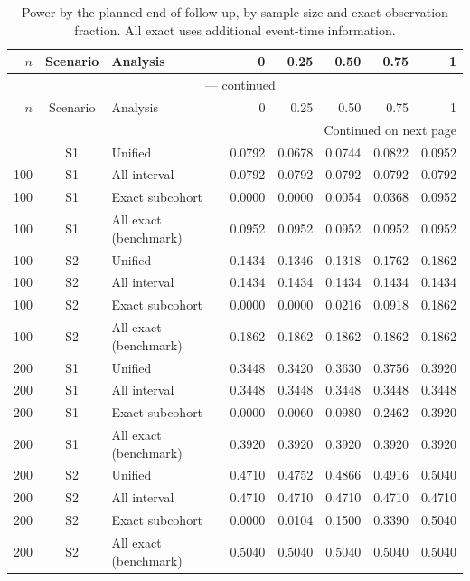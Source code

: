 \documentclass[12pt]{article}
\theoremstyle{definition}
\theoremstyle{remark}
\begin{document}
\begingroup
\scriptsize
\setlength{\tabcolsep}{3pt}
\renewcommand{\arraystretch}{1.10}
\setlength{\LTcapwidth}{\textwidth}
\begin{longtable}{rclrrrrr}
\caption{Power by the planned end of follow-up, by sample size and exact-observation fraction. All exact uses additional event-time information.}\label{tab:app-mixed-power}\\
\toprule
$n$ & Scenario & Analysis & 0 & 0.25 & 0.50 & 0.75 & 1 \\
\midrule
\endfirsthead
\multicolumn{8}{c}{\tablename\ \thetable{} --- continued}\\
\toprule
$n$ & Scenario & Analysis & 0 & 0.25 & 0.50 & 0.75 & 1 \\
\midrule
\endhead
\midrule
\multicolumn{8}{r}{Continued on next page}\\
\endfoot
\bottomrule
\endlastfoot
100 & S1 & Unified & 0.0792 & 0.0678 & 0.0744 & 0.0822 & 0.0952 \\
100 & S1 & All interval & 0.0792 & 0.0792 & 0.0792 & 0.0792 & 0.0792 \\
100 & S1 & Exact subcohort & 0.0000 & 0.0000 & 0.0054 & 0.0368 & 0.0952 \\
100 & S1 & All exact (benchmark) & 0.0952 & 0.0952 & 0.0952 & 0.0952 & 0.0952 \\
100 & S2 & Unified & 0.1434 & 0.1346 & 0.1318 & 0.1762 & 0.1862 \\
100 & S2 & All interval & 0.1434 & 0.1434 & 0.1434 & 0.1434 & 0.1434 \\
100 & S2 & Exact subcohort & 0.0000 & 0.0000 & 0.0216 & 0.0918 & 0.1862 \\
100 & S2 & All exact (benchmark) & 0.1862 & 0.1862 & 0.1862 & 0.1862 & 0.1862 \\
200 & S1 & Unified & 0.3448 & 0.3420 & 0.3630 & 0.3756 & 0.3920 \\
200 & S1 & All interval & 0.3448 & 0.3448 & 0.3448 & 0.3448 & 0.3448 \\
200 & S1 & Exact subcohort & 0.0000 & 0.0060 & 0.0980 & 0.2462 & 0.3920 \\
200 & S1 & All exact (benchmark) & 0.3920 & 0.3920 & 0.3920 & 0.3920 & 0.3920 \\
200 & S2 & Unified & 0.4710 & 0.4752 & 0.4866 & 0.4916 & 0.5040 \\
200 & S2 & All interval & 0.4710 & 0.4710 & 0.4710 & 0.4710 & 0.4710 \\
200 & S2 & Exact subcohort & 0.0000 & 0.0104 & 0.1500 & 0.3390 & 0.5040 \\
200 & S2 & All exact (benchmark) & 0.5040 & 0.5040 & 0.5040 & 0.5040 & 0.5040 \\

\end{longtable}
\end{document}
